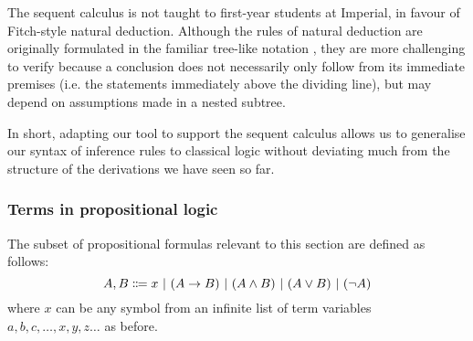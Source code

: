 The sequent calculus is not taught to first-year students at Imperial, in favour of Fitch-style natural deduction. Although the rules of natural deduction are originally formulated in the familiar tree-like notation \cite{gentzen:1969}, they are more challenging to verify because a conclusion does not necessarily only follow from its immediate premises (i.e. the statements immediately above the dividing line), but may depend on assumptions made in a nested subtree.

In short, adapting our tool to support the sequent calculus allows us to generalise our syntax of inference rules to classical logic without deviating much from the structure of the derivations we have seen so far.

\subsubsection{Terms in propositional logic}
The subset of propositional formulas relevant to this section are defined as follows:
\[
    A, B \Coloneqq x \ |\  (A \to B) \ |\  (A \land B) \ |\  (A \lor B) \ |\  (\lnot A)
\]
where $x$ can be any symbol from an infinite list of term variables $a, b, c, \ldots, x, y, z \ldots$ as before.

